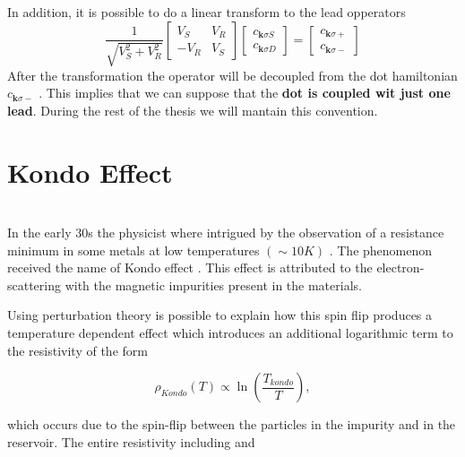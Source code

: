 In addition, it is possible to do a linear transform to the lead opperators 
\begin{equation}
    \frac{1}{\sqrt{V_{S}^{2}+V_{R}^{2}}}\left[\begin{array}{cc}
V_{S} & V_{R}\\
-V_{R} & V_{S}
\end{array}\right]\left[\begin{array}{c}
c_{\mathbf{k}\sigma S}\\
c_{\mathbf{k}\sigma D}
\end{array}\right]=\left[\begin{array}{c}
c_{\mathbf{k}\sigma+}\\
c_{\mathbf{k}\sigma-}
\end{array}\right]
\end{equation}
After the transformation the operator will be decoupled from the dot hamiltonian $c_{\mathbf{k}\sigma-}$ . This implies that we can suppose that the  \textbf{dot is coupled wit just one lead}. During the rest of the thesis we will mantain this convention. 


\section{Kondo Effect}

\\

In the early 30s the physicist where intrigued by the observation of a resistance minimum in some metals at low temperatures $(\sim 10K)$ \cite{sindel_numerical_2005} . The phenomenon received the name of Kondo effect \citep{hewson_kondo_1997}. This effect is attributed to the electron-scattering with the magnetic impurities present in the materials. 

Using perturbation theory is possible to explain how this spin flip produces a  temperature dependent effect which  introduces an additional logarithmic term to the resistivity of the form

\begin{equation}
\rho_{Kondo}(T) \propto \ln{\left( \frac{T_{kondo}}{T} \right)},
\label{logKondo}
\end{equation}



which occurs due to the spin-flip between the particles in the impurity and in the reservoir. The entire resistivity including  and 

